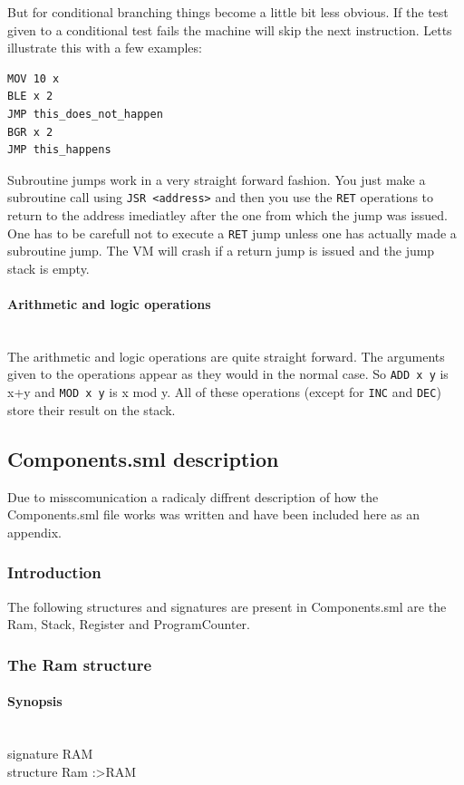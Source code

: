 \documentclass{article}
\newcommand{\V}{\verb}
\begin{document}
But for conditional branching things become a little bit less obvious. If the
test given to a conditional test fails the machine will skip the next
instruction. Letts illustrate this with a few examples:
\begin{verbatim}
MOV 10 x
BLE x 2
JMP this_does_not_happen
BGR x 2
JMP this_happens
\end{verbatim}

Subroutine jumps work in a very straight forward fashion. You just make a
subroutine call using \V+JSR <address>+ and then you use the \V+RET+ operations
to return to the address imediatley after the one from which the jump was
issued. One has to be carefull not to execute a \V+RET+ jump unless one has
actually made a subroutine jump. The VM will crash if a return jump is issued
and the jump stack is empty.

\paragraph{Arithmetic and logic operations} \
\\
The arithmetic and logic operations are quite straight forward. The arguments
given to the operations appear as they would in the normal case. So \V+ADD x y+
is x+y and \V+MOD x y+ is x mod y. All of these operations (except for \V+INC+
and \V+DEC+) store their result on the stack.

\subsection{Components.sml description}
Due to misscomunication a radicaly diffrent description of how the
Components.sml file works was written and have been included here as an
appendix.
\subsubsection{Introduction}

The following structures and signatures are present in Components.sml are the
Ram, Stack, Register and ProgramCounter.

\subsubsection{The Ram structure}
\paragraph{Synopsis} \
\\
signature RAM\\
structure Ram :\textgreater RAM\\
\end{document}
